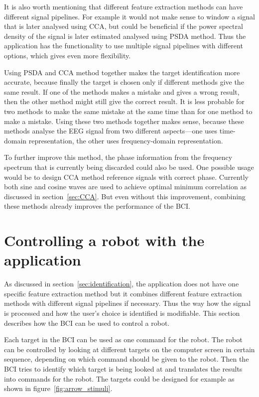 It is also worth mentioning that different \gls{feature extraction} methods can have different signal pipelines. For example it would not make sense to \gls{window} a signal that is later analysed using \gls{CCA}, but  could be beneficial if the \gls{power spectral density} of the signal is later estimated analysed using \gls{PSDA} method. Thus the application has the functionality to use multiple signal pipelines with different options, which gives even more flexibility.

Using \gls{PSDA} and \gls{CCA} method together makes the \gls{target} identification more accurate, because finally the \gls{target} is chosen only if different methods give the same result. If one of the methods makes a mistake and gives a wrong result, then the other method might still give the correct result. It is less probable for two methods to make the same mistake at the same time than for one method to make a mistake. Using these two methods together makes sense, because these methods analyse the \gls{EEG} signal from two different aspects---one uses time-domain representation, the other uses frequency-domain representation.

To further improve this method, the phase information from the \gls{frequency spectrum} that is currently being discarded could also be used. One possible usage would be to design \gls{CCA} method \glspl{reference signal} with correct phase. Currently both sine and cosine waves are used to achieve optimal minimum correlation as discussed in section~\ref{sec:CCA}. But even without this improvement, combining these methods already improves the performance of the \gls{BCI}.

\section{Controlling a robot with the application}

As discussed in section~\ref{sec:identification}, the application does not have one specific \gls{feature extraction} method but it combines different \gls{feature extraction} methods with different signal pipelines if necessary. Thus the way how the signal is processed and how the user's choice is identified is modifiable. This section describes how the \gls{BCI} can be used to control a robot.

Each \gls{target} in the \gls{BCI} can be used as one command for the robot. The robot can be controlled by looking at different \glspl{target} on the computer screen in certain sequence, depending on which command should be given to the robot. Then the \gls{BCI} tries to identify which \gls{target} is being looked at and translates the results into commands for the robot. The \glspl{target} could be designed for example as shown in figure~\ref{fig:arrow_stimuli}.

